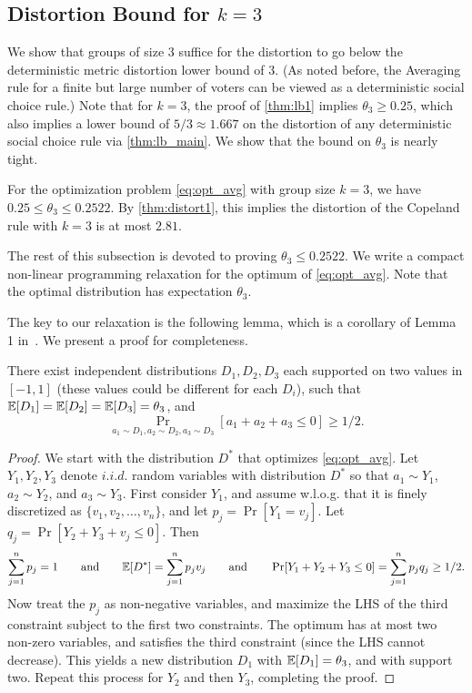 
\subsection{Distortion Bound for $k=3$}
We show that groups of size $3$ suffice for the distortion to go below the deterministic metric distortion lower bound of $3$. (As noted before, the Averaging rule for a finite but large number of voters can be viewed as a deterministic social choice rule.) Note that for $k=3$, the proof of \cref{thm:lb1} implies $\theta_3 \ge 0.25$, which also implies a lower bound of $5/3 \approx 1.667$ on the distortion of any deterministic social choice rule via \cref{thm:lb_main}. We show that the bound on $\theta_3$ is nearly tight.

\begin{theorem}
\label{thm:theta3}
For the optimization problem \cref{eq:opt_avg} with group size $k=3$, we have $0.25 \le \theta_3 \le 0.2522$. By \cref{thm:distort1}, this implies the distortion of the Copeland rule with $k = 3$ is at most $2.81$.
\end{theorem}

 

The rest of this subsection is devoted to proving $\theta_3 \le 0.2522$. We write a compact non-linear programming relaxation for the optimum of \cref{eq:opt_avg}. Note that the optimal distribution has expectation $\theta_3$. 

The key to our relaxation is the following lemma, which is a corollary of Lemma 1 in~\cite{Feige}. We present a proof for completeness.

\begin{lemma}  There exist independent distributions $D_1, D_2, D_3$ each supported on two values in $[-1,1]$ (these values could be different for each $D_i$), such that $\mathbb{E}[D_1] = \mathbb{E}[D_2] = \mathbb{E}[D_3] = \theta_3$, and 
\begin{equation}
\label{eq:feige}
\Pr_{a_1  \sim D_1, a_2 \sim D_2, a_3 \sim D_3} \left[ a_1 + a_2 + a_3 \le 0 \right] \ge 1/2. 
\end{equation}
\end{lemma}
\begin{proof}
We start with the distribution $D^*$ that optimizes \cref{eq:opt_avg}. Let $Y_1,Y_2,Y_3$ denote $i.i.d.$ random variables with distribution $D^*$ so that $a_1 \sim Y_1$, $a_2 \sim Y_2$, and $a_3 \sim Y_3$. First consider $Y_1$, and assume w.l.o.g. that it is finely discretized as $\{v_1,v_2, \ldots, v_n\}$, and let $p_j = \Pr[Y_1 = v_j]$. Let $q_j = \Pr[Y_2 + Y_3 + v_j \le 0]$. Then
$$ \sum_{j=1}^n p_j = 1 \qquad \mbox{and} \qquad \mathbb{E}[D^*] = \sum_{j=1}^n p_j v_j \qquad \mbox{and} \qquad \Pr[Y_1 + Y_2 + Y_3 \le 0] = \sum_{j=1}^n p_j q_j \ge 1/2.$$
Now treat the $p_j$ as non-negative variables, and maximize the LHS of the third constraint subject to the first two constraints. The optimum has at most two non-zero variables, and satisfies the third constraint (since the LHS cannot decrease). This yields a new distribution $D_1$ with $\mathbb{E}[D_1] = \theta_3$, and with support two. Repeat this process for $Y_2$ and then $Y_3$, completing the proof.
\end{proof}


